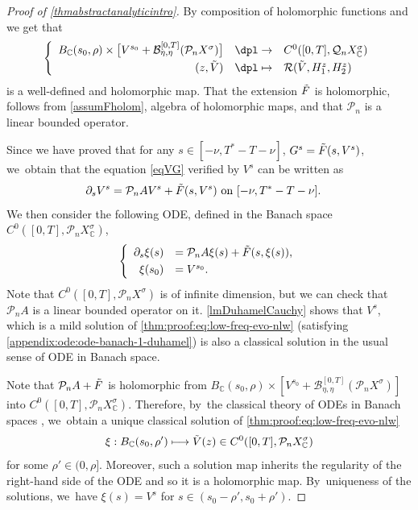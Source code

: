 \documentclass[JEP,XML,SOM,Unicode,published]{cedram}
\newcommand\mto{\mathchoice{\longmapsto}{\mapsto}{\mapsto}{\mapsto}}
\theoremstyle{definition}
\let\mc\mathcal
\newcommand{\B}{\mc{B}}
\newcommand{\Q}{\mathcal{Q}}
\renewcommand{\P}{\mathcal{P}}
\begin{document}
\begin{proof}[Proof of \cref{thmabstractanalyticintro}]
By composition of holomorphic functions and \cite[Prop.\,8.10]{Muj86} we get that
\begin{align*}
\left\{\begin{array}{rcl}
B_{\mathbb{C}}(s_0, \rho)\times \bigl[V^{s_0}+\B_{\eta,\eta}^{[0,T]}(\P_n X^{\sigma})\bigr]&\dpl\to& C^0([0, T], \Q_n X_\mathbb{C}^\sigma)\\[3pt]
(z,\Tilde{V})&\dpl\mto& \mathcal{R}(\Tilde{V},H_{1}^z,H_{2}^z)
\end{array}\right.
\end{align*}
is a well-defined and holomorphic map. That the extension $\Tilde{F}$ is holomorphic, follows from \cref{assumFholom}, algebra of holomorphic maps, and that $\P_n$ is a linear bounded operator.

Since we have proved that for any $s\in [-\nu, T^*-T-\nu]$, $G^s=\Tilde{F}(s,V^s)$, we~obtain that the equation \eqref{eqVG} verified by $V^s$ can be written as
\begin{align*}
\partial_s V^s=\P_n AV^s+\Tilde{F}(s,V^s)& \textnormal{ on } [-\nu, T^*-T-\nu].
\end{align*}
We then consider the following ODE, defined in the Banach space $C^0([0, T], \P_n X_\mathbb{C}^\sigma)$,
\begin{align}\label{thm:proof:eq:low-freq-evo-nlw}
\left\{\begin{array}{rl}
\partial_s \xi(s)&=\P_nA\xi(s)+\Tilde{F}(s, \xi(s)), \\[3pt]
\xi(s_0)&=V^{s_0}.
\end{array}\right.
\end{align}
Note that $C^0([0,T], \P_n X^\sigma)$ is of infinite dimension, but we can check that $\P_n A$ is a linear bounded operator on it. \cref{lmDuhamelCauchy} shows that $V^s$, which is a mild solution of \eqref{thm:proof:eq:low-freq-evo-nlw} (\ie satisfying \eqref{appendix:ode:ode-banach-1-duhamel}) is also a classical solution in the usual sense of ODE in Banach space.

Note that $\P_n A+\Tilde{F}$ is holomorphic from $ B_{\mathbb{C}}(s_0, \rho)\times \left[V^{s_0}+ \B_{\eta,\eta}^{[0,T]}(\P_n X^{\sigma})\right]$ into $C^0([0, T], \P_n X_{\mathbb{C}}^\sigma)$. Therefore, by~the classical theory of ODEs in Banach spaces \cite[Th.\,10.4.5]{1969:dieudonne:modern-analysis}, we~obtain a unique classical solution of \eqref{thm:proof:eq:low-freq-evo-nlw}
\begin{align*}
\xi:B_{\mathbb{C}}(s_0, \rho')\mto \Tilde{V}(z)\in C^0([0,T], \P_n X_{\mathbb{C}}^\sigma)
\end{align*}
for some $\rho'\in (0, \rho]$. Moreover, such a solution map inherits the regularity of the right-hand side of the ODE and so it is a holomorphic map. By~uniqueness of the solutions, we~have $\xi(s)=V^s$ for $s\in (s_0-\rho',s_0+\rho')$.


\end{proof}
\end{document}
